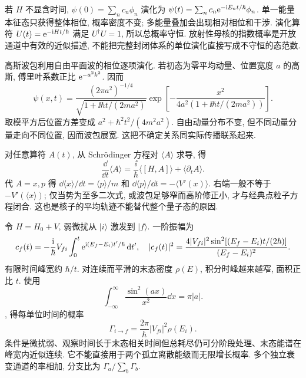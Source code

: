 \label{ch:golden}
若 $H$ 不显含时间, $\psi(0)=\sum_nc_n\phi_n$ 演化为 $\psi(t)=\sum_nc_n\mathrm e^{-\mathrm i E_nt/\hbar}\phi_n$. 单一能量本征态只获得整体相位, 概率密度不变; 多能量叠加会出现相对相位和干涉. 演化算符 $U(t)=\mathrm e^{-\mathrm i Ht/\hbar}$ 满足 $U^\dagger U=1$, 所以总概率守恒. 放射性母核的指数概率是开放通道中有效的近似描述, 不能把完整封闭体系的单位演化直接写成不守恒的态范数.

高斯波包利用自由平面波的相位逐项演化. 若初态为零平均动量、位置宽度 $a$ 的高斯, 傅里叶系数正比 $\mathrm e^{-a^2k^2}$. 因而
\begin{equation}
 \psi(x,t)=\frac{(2\pi a^2)^{-1/4}}{\sqrt{1+\ii\hbar t/(2ma^2)}}
 \exp\left[-\frac{x^2}{4a^2(1+\ii\hbar t/(2ma^2))}\right].
\end{equation}
取模平方后位置方差变成 $a^2+\hbar^2t^2/(4m^2a^2)$. 自由动量分布不变, 但不同动量分量走向不同位置, 因而波包展宽. 这把不确定关系同实际传播联系起来.

对任意算符 $A(t)$, 从 Schrödinger 方程对 $\langle A\rangle$ 求导, 得
\begin{equation}
 \frac{\dd}{\dd t}\langle A\rangle=\frac{\ii}\hbar\langle[H,A]\rangle+\langle\partial_tA\rangle.
\end{equation}
代 $A=x,p$ 得 $\dd\langle x\rangle/\dd t=\langle p\rangle/m$ 和 $\dd\langle p\rangle/\dd t=-\langle V'(x)\rangle$. 右端一般不等于 $-V'(\langle x\rangle)$; 仅当势为至多二次式, 或波包足够窄而高阶修正小, 才与经典点粒子方程闭合. 这也是核子的平均轨迹不能替代整个量子态的原因.

令 $H=H_0+V$, 弱微扰从 $|i\rangle$ 激发到 $|f\rangle$. 一阶振幅为
\begin{equation}
 c_f(t)=-\frac{\mathrm i}\hbar V_{fi}\int_0^t\mathrm e^{\mathrm i(E_f-E_i)t'/\hbar}\,\mathrm d t',
 \quad |c_f(t)|^2=\frac{4|V_{fi}|^2\sin^2[(E_f-E_i)t/(2\hbar)]}{(E_f-E_i)^2}.
\end{equation}
有限时间峰宽约 $\hbar/t$. 对连续而平滑的末态密度 $\rho(E)$, 积分时峰越来越窄, 面积正比 $t$. 使用
\begin{equation}\int_{-\infty}^{\infty}\frac{\sin^2(ax)}{x^2}\dd x=\pi|a|.\end{equation}, 得每单位时间的概率
\begin{equation}\label{eq:golden}
 \Gamma_{i\to f}=\frac{2\pi}{\hbar}|V_{fi}|^2\rho(E_i).
\end{equation}
条件是微扰弱、观察时间长于末态相关时间但总耗尽仍可分阶段处理、末态能谱在峰宽内近似连续. 它不能直接用于两个孤立离散能级而无限增长概率. 多个独立衰变通道的率相加, 分支比为 $\Gamma_a/\sum_b\Gamma_b$.

